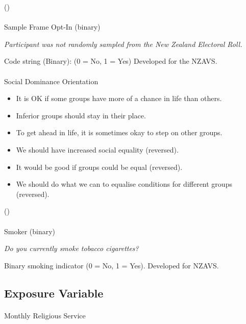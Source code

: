 \documentclass[
  single column]{article}
\makeatletter
\let\oldparagraph\paragraph
\renewcommand{\paragraph}{
    \@ifstar
      \xxxParagraphStar
      \xxxParagraphNoStar
  }
\newcommand{\xxxParagraphStar}[1]{\oldparagraph*{#1}\mbox{}}
\newcommand{\xxxParagraphNoStar}[1]{\oldparagraph{#1}\mbox{}}
\providecommand{\tightlist}{%
  \setlength{\itemsep}{0pt}\setlength{\parskip}{0pt}}\usepackage{longtable,booktabs,array}
\makeatother
\begin{document}
()

\paragraph{Sample Frame Opt-In
(binary)}\label{sample-frame-opt-in-binary}

\emph{Participant was not randomly sampled from the New Zealand
Electoral Roll.}

Code string (Binary): (0 = No, 1 = Yes) Developed for the NZAVS.

\paragraph{Social Dominance
Orientation}\label{social-dominance-orientation}

\begin{itemize}
\tightlist
\item
  It is OK if some groups have more of a chance in life than others.
\item
  Inferior groups should stay in their place.
\item
  To get ahead in life, it is sometimes okay to step on other groups.
\item
  We should have increased social equality (reversed).
\item
  It would be good if groups could be equal (reversed).
\item
  We should do what we can to equalise conditions for different groups
  (reversed).
\end{itemize}

()

\paragraph{Smoker (binary)}\label{smoker-binary}

\emph{Do you currently smoke tobacco cigarettes?}

Binary smoking indicator (0 = No, 1 = Yes). Developed for NZAVS.

\subsection{Exposure Variable}\label{exposure-variable}

\paragraph{Monthly Religious Service}\label{monthly-religious-service}
\end{document}
